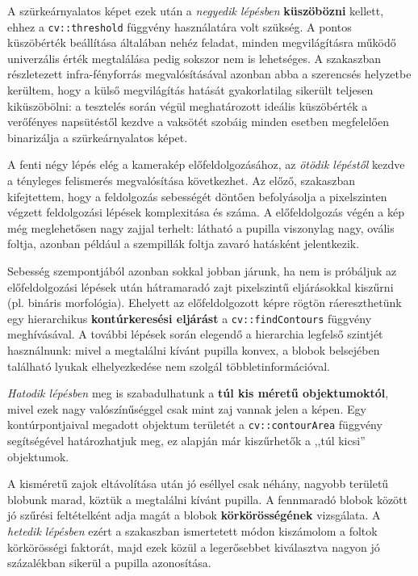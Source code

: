 A szürkeárnyalatos képet ezek után a \emph{negyedik lépésben} \textbf{küszöbözni} kellett, ehhez a \texttt{cv::threshold} függvény használatára volt szükség. A pontos küszöbérték beállítása általában nehéz feladat, minden megvilágításra működő univerzális érték megtalálása pedig sokszor nem is lehetséges. A  szakaszban részletezett infra-fényforrás megvalósításával azonban abba a szerencsés helyzetbe kerültem, hogy a külső megvilágítás hatását gyakorlatilag sikerült teljesen kiküszöbölni: a tesztelés során végül meghatározott ideális küszöbérték a verőfényes napsütéstől kezdve a vaksötét szobáig minden esetben megfelelően binarizálja a szürkeárnyalatos képet.

\bigskip

A fenti négy lépés elég a kamerakép előfeldolgozásához, az \emph{ötödik lépéstől} kezdve a tényleges felismerés megvalósítása következhet. Az előző,  szakaszban kifejtettem, hogy a feldolgozás sebességét döntően befolyásolja a pixelszinten végzett feldolgozási lépések komplexitása és száma. A előfeldolgozás végén a kép még meglehetősen nagy zajjal terhelt: látható a pupilla viszonylag nagy, ovális foltja, azonban például a szempillák foltja zavaró hatásként jelentkezik.

Sebesség szempontjából azonban sokkal jobban járunk, ha nem is próbáljuk az előfeldolgozási lépések után hátramaradó zajt pixelszintű eljárásokkal kiszűrni (pl. bináris morfológia). Ehelyett az előfeldolgozott képre rögtön ráereszthetünk egy hierarchikus \textbf{kontúrkeresési eljárást} a \texttt{cv::findContours} függvény meghívásával. A további lépések során elegendő a hierarchia legfelső szintjét használnunk: mivel a megtalálni kívánt pupilla konvex, a blobok belsejében található lyukak elhelyezkedése nem szolgál többletinformációval.

\emph{Hatodik lépésben} meg is szabadulhatunk a \textbf{túl kis méretű objektumoktól}, mivel ezek nagy valószínűséggel csak mint zaj vannak jelen a képen. Egy kontúrpontjaival megadott objektum területét a \texttt{cv::contourArea} függvény segítségével határozhatjuk meg, ez alapján már kiszűrhetők a ,,túl kicsi'' objektumok.

A kisméretű zajok eltávolítása után jó eséllyel csak néhány, nagyobb területű blobunk marad, köztük a megtalálni kívánt pupilla. A fennmaradó blobok között jó szűrési feltételként adja magát a blobok \textbf{körkörösségének} vizsgálata. A \emph{hetedik lépésben} ezért a  szakaszban ismertetett módon kiszámolom a foltok körkörösségi faktorát, majd ezek közül a legerősebbet kiválasztva nagyon jó százalékban sikerül a pupilla azonosítása.

